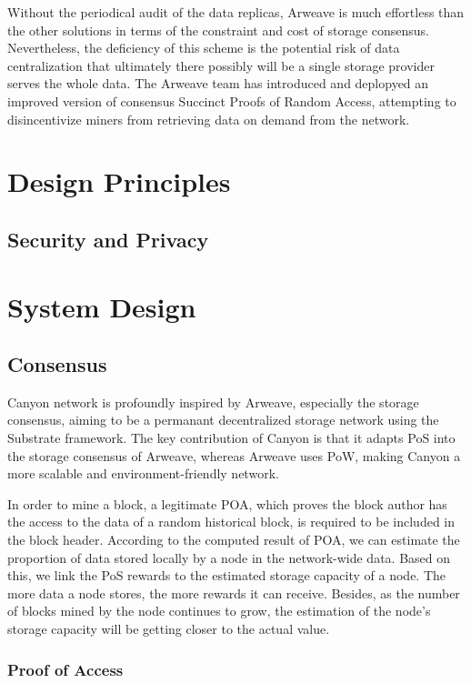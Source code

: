 \documentclass[]{article}
\begin{document}
Without the periodical audit of the data replicas, Arweave is much effortless than the other solutions in terms of the constraint and cost of storage consensus. Nevertheless, the deficiency of this scheme is the potential risk of data centralization that ultimately there possibly will be a single storage provider serves the whole data. The Arweave team has introduced and deplopyed an improved version of consensus Succinct Proofs of Random Access, attempting to disincentivize miners from retrieving data on demand from the network.

\section{Design Principles\\
}

\subsection{Security and Privacy}

\section{System Design}

\subsection{Consensus}

Canyon network is profoundly inspired by Arweave, especially the storage consensus, aiming to be a permanant decentralized storage network using the Substrate framework. The key contribution of Canyon is that it adapts PoS into the storage consensus of Arweave, whereas Arweave uses PoW, making Canyon a more scalable and environment-friendly network.

In order to mine a block, a legitimate POA, which proves the block author has the access to the data of a random historical block, is required to be included in the block header. According to the computed result of POA, we can estimate the proportion of data stored locally by a node in the network-wide data. Based on this, we link the PoS rewards to the estimated storage capacity of a node. The more data a node stores, the more rewards it can receive. Besides, as the number of blocks mined by the node continues to grow, the estimation of the node's storage capacity will be getting closer to the actual value.

\subsubsection{Proof of Access}
\end{document}
